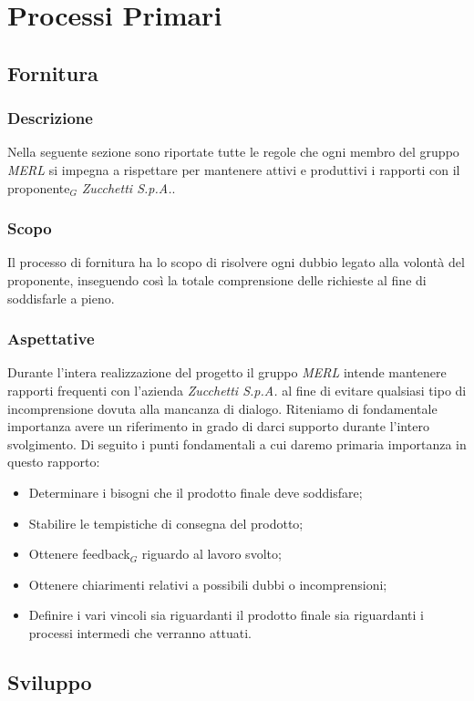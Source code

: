 \chapter{Processi Primari}

\section{Fornitura}
\subsection{Descrizione}
Nella seguente sezione sono riportate tutte le regole che ogni membro del gruppo \textit{MERL} si impegna a rispettare per mantenere attivi e produttivi i rapporti con il proponente$_G$ \textit{Zucchetti S.p.A.}.

\subsection{Scopo}
Il processo di fornitura ha lo scopo di risolvere ogni dubbio legato alla volontà del proponente, inseguendo così la totale comprensione delle richieste al fine di soddisfarle a pieno.

\subsection{Aspettative}
Durante l'intera realizzazione del progetto il gruppo \textit{MERL} intende mantenere rapporti frequenti con l'azienda \textit{Zucchetti S.p.A.} al fine di evitare qualsiasi tipo di incomprensione dovuta alla mancanza di dialogo. Riteniamo di fondamentale importanza avere un riferimento in grado di darci supporto durante l'intero svolgimento. Di seguito i punti fondamentali a cui daremo primaria importanza in questo rapporto:
\begin{itemize}
 \item Determinare i bisogni che il prodotto finale deve soddisfare;
 \item Stabilire le tempistiche di consegna del prodotto;
 \item Ottenere feedback$_G$ riguardo al lavoro svolto;
 \item Ottenere chiarimenti relativi a possibili dubbi o incomprensioni;
 \item Definire i vari vincoli sia riguardanti il prodotto finale sia riguardanti i processi intermedi che verranno attuati.
\end{itemize}

\section{Sviluppo}


